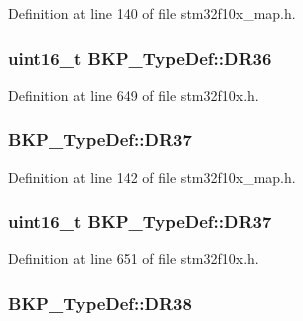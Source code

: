 Definition at line 140 of file stm32f10x\+\_\+map.\+h.

\subsubsection[{\texorpdfstring{D\+R36}{DR36}}]{ {\bf uint16\+\_\+t} B\+K\+P\+\_\+\+Type\+Def\+::\+D\+R36}\hypertarget{struct_b_k_p___type_def_a239295664cc073b3f3da282fa73dc3c6}{}\label{struct_b_k_p___type_def_a239295664cc073b3f3da282fa73dc3c6}


Definition at line 649 of file stm32f10x.\+h.

\subsubsection[{\texorpdfstring{D\+R37}{DR37}}]{ B\+K\+P\+\_\+\+Type\+Def\+::\+D\+R37}\hypertarget{struct_b_k_p___type_def_ab2186e12ce6e63bbf807bf384babcf45}{}\label{struct_b_k_p___type_def_ab2186e12ce6e63bbf807bf384babcf45}


Definition at line 142 of file stm32f10x\+\_\+map.\+h.

\subsubsection[{\texorpdfstring{D\+R37}{DR37}}]{ {\bf uint16\+\_\+t} B\+K\+P\+\_\+\+Type\+Def\+::\+D\+R37}\hypertarget{struct_b_k_p___type_def_aa1f71e6639cfcc903c534596672fb007}{}\label{struct_b_k_p___type_def_aa1f71e6639cfcc903c534596672fb007}


Definition at line 651 of file stm32f10x.\+h.

\subsubsection[{\texorpdfstring{D\+R38}{DR38}}]{ B\+K\+P\+\_\+\+Type\+Def\+::\+D\+R38}\hypertarget{struct_b_k_p___type_def_a87b104c692037ab8e70443e0d190aec3}{}\label{struct_b_k_p___type_def_a87b104c692037ab8e70443e0d190aec3}


